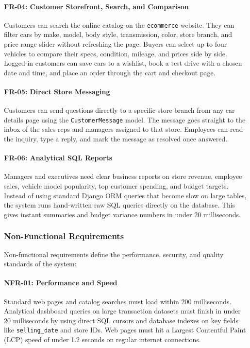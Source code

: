\paragraph{FR-04: Customer Storefront, Search, and Comparison}
Customers can search the online catalog on the \texttt{ecommerce} website. They can filter cars by make, model, body style, transmission, color, store branch, and price range slider without refreshing the page. Buyers can select up to four vehicles to compare their specs, condition, mileage, and prices side by side. Logged-in customers can save cars to a wishlist, book a test drive with a chosen date and time, and place an order through the cart and checkout page.

\paragraph{FR-05: Direct Store Messaging}
Customers can send questions directly to a specific store branch from any car details page using the \texttt{CustomerMessage} model. The message goes straight to the inbox of the sales reps and managers assigned to that store. Employees can read the inquiry, type a reply, and mark the message as resolved once answered.

\paragraph{FR-06: Analytical SQL Reports}
Managers and executives need clear business reports on store revenue, employee sales, vehicle model popularity, top customer spending, and budget targets. Instead of using standard Django ORM queries that become slow on large tables, the system runs hand-written raw SQL queries directly on the database. This gives instant summaries and budget variance numbers in under 20 milliseconds.

\subsubsection{Non-Functional Requirements}
Non-functional requirements define the performance, security, and quality standards of the system:

\paragraph{NFR-01: Performance and Speed}
Standard web pages and catalog searches must load within 200 milliseconds. Analytical dashboard queries on large transaction datasets must finish in under 20 milliseconds by using direct SQL cursors and database indexes on key fields like \texttt{selling\_date} and store IDs. Web pages must hit a Largest Contentful Paint (LCP) speed of under 1.2 seconds on regular internet connections.

